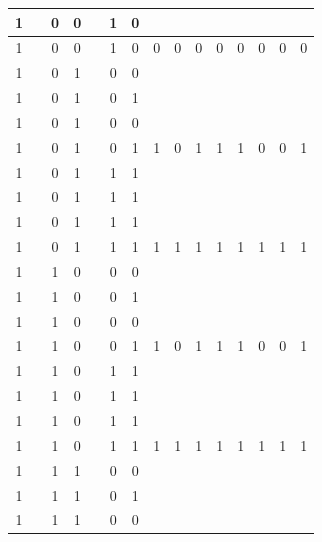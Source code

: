 \begin{table}[!tb]
\begin{tabular}{|c|c|c|c|c|c|c|c|c|c|c|c|c|c|c|}
        \rowcolor{yellow!40} 1 &  & 0 & 0 &  & 1 & 0 &  &  &  &  &  &  &  &  \\ \hline
        \rowcolor{yellow!40} 1 &  & 0 & 0 &  & 1 & 0 & 0 & 0 & 0 & 0 & 0 & 0 & 0 & 0 \\ \hline
        \rowcolor{gray!40} 1 &  & 0 & 1 &  & 0 & 0 &  &  &  &  &  &  &  &  \\ \hline
        \rowcolor{gray!40} 1 &  & 0 & 1 &  & 0 & 1 &  &  &  &  &  &  &  &  \\ \hline
        \rowcolor{gray!40} 1 &  & 0 & 1 &  & 0 & 0 &  &  &  &  &  &  &  &  \\ \hline
        \rowcolor{gray!40} 1 &  & 0 & 1 &  & 0 & 1 & 1 & 0 & 1 & 1 & 1 & 0 & 0 & 1 \\ \hline
        \rowcolor{blue!40} 1 &  & 0 & 1 &  & 1 & 1 &  &  &  &  &  &  &  &  \\ \hline
        \rowcolor{blue!40} 1 &  & 0 & 1 &  & 1 & 1 &  &  &  &  &  &  &  &  \\ \hline
        \rowcolor{blue!40} 1 &  & 0 & 1 &  & 1 & 1 &  &  &  &  &  &  &  &  \\ \hline
        \rowcolor{blue!40} 1 &  & 0 & 1 &  & 1 & 1 & 1 & 1 & 1 & 1 & 1 & 1 & 1 & 1 \\ \hline
        \rowcolor{red!40} 1 &  & 1 & 0 &  & 0 & 0 &  &  &  &  &  &  &  &  \\ \hline
        \rowcolor{red!40} 1 &  & 1 & 0 &  & 0 & 1 &  &  &  &  &  &  &  &  \\ \hline
        \rowcolor{red!40} 1 &  & 1 & 0 &  & 0 & 0 &  &  &  &  &  &  &  &  \\ \hline
        \rowcolor{red!40} 1 &  & 1 & 0 &  & 0 & 1 & 1 & 0 & 1 & 1 & 1 & 0 & 0 & 1 \\ \hline
        \rowcolor{green!40} 1 &  & 1 & 0 &  & 1 & 1 &  &  &  &  &  &  &  &  \\ \hline
        \rowcolor{green!40} 1 &  & 1 & 0 &  & 1 & 1 &  &  &  &  &  &  &  &  \\ \hline
        \rowcolor{green!40} 1 &  & 1 & 0 &  & 1 & 1 &  &  &  &  &  &  &  &  \\ \hline
        \rowcolor{green!40} 1 &  & 1 & 0 &  & 1 & 1 & 1 & 1 & 1 & 1 & 1 & 1 & 1 & 1 \\ \hline
        \rowcolor{yellow!40} 1 &  & 1 & 1 &  & 0 & 0 &  &  &  &  &  &  &  &  \\ \hline
        \rowcolor{yellow!40} 1 &  & 1 & 1 &  & 0 & 1 &  &  &  &  &  &  &  &  \\ \hline
        \rowcolor{yellow!40} 1 &  & 1 & 1 &  & 0 & 0 &  &  &  &  &  &  &  &  \\ \hline

\end{tabular}
\end{table}
